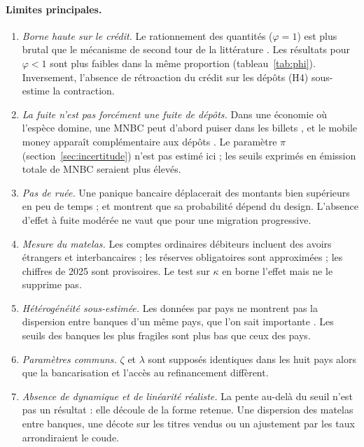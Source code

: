 \documentclass[11pt,a4paper]{article}
\begin{document}
	\paragraph{Limites principales.}
	\begin{enumerate}[nosep,label=(\roman*)]
		\item \emph{Borne haute sur le crédit.} Le rationnement des quantités ($\varphi=1$) est plus brutal que le mécanisme de second tour de la littérature \citep{kumhof2018, bouis2024}. Les résultats pour $\varphi<1$ sont plus faibles dans la même proportion (tableau~\ref{tab:phi}). Inversement, l'absence de rétroaction du crédit sur les dépôts (H4) sous-estime la contraction.
		\item \emph{La fuite n'est pas forcément une fuite de dépôts.} Dans une économie où l'espèce domine, une MNBC peut d'abord puiser dans les billets \citep{bouis2024}, et le mobile money apparaît complémentaire aux dépôts \citep{trinnou2023}. Le paramètre $\pi$ (section~\ref{sec:incertitude}) n'est pas estimé ici ; les seuils exprimés en émission totale de MNBC seraient plus élevés.
		\item \emph{Pas de ruée.} Une panique bancaire \citep{diamond1983} déplacerait des montants bien supérieurs en peu de temps ; \citet{schilling2024} et \citet{bidder2024} montrent que sa probabilité dépend du design. L'absence d'effet à fuite modérée ne vaut que pour une migration progressive.
		\item \emph{Mesure du matelas.} Les comptes ordinaires débiteurs incluent des avoirs étrangers et interbancaires ; les réserves obligatoires sont approximées ; les chiffres de 2025 sont provisoires. Le test sur $\kappa$ en borne l'effet mais ne le supprime pas.
		\item \emph{Hétérogénéité sous-estimée.} Les données par pays ne montrent pas la dispersion entre banques d'un même pays, que l'on sait importante \citep{adalid2022, fritz2024}. Les seuils des banques les plus fragiles sont plus bas que ceux des pays.
		\item \emph{Paramètres communs.} $\zeta$ et $\lambda$ sont supposés identiques dans les huit pays alors que la bancarisation et l'accès au refinancement diffèrent.
		\item \emph{Absence de dynamique et de linéarité réaliste.} La pente au-delà du seuil n'est pas un résultat : elle découle de la forme retenue. Une dispersion des matelas entre banques, une décote sur les titres vendus ou un ajustement par les taux arrondiraient le coude.
	\end{enumerate}
	
\end{document}
